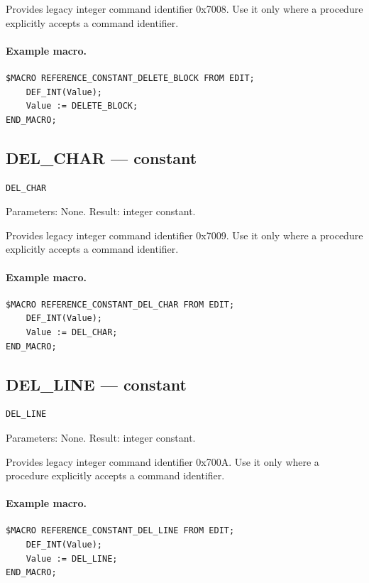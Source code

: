 \documentclass[a4paper,10pt,twoside,openany]{book}
\begin{document}
Provides legacy integer command identifier 0x7008. Use it only where a procedure explicitly accepts a command identifier.

\paragraph{Example macro.}
\begin{verbatim}
$MACRO REFERENCE_CONSTANT_DELETE_BLOCK FROM EDIT;
    DEF_INT(Value);
    Value := DELETE_BLOCK;
END_MACRO;
\end{verbatim}

\label{prim:constant-del-char}
\subsection*{DEL\_CHAR --- constant}
\begin{verbatim}
DEL_CHAR
\end{verbatim}
Parameters: None. Result: integer constant.

Provides legacy integer command identifier 0x7009. Use it only where a procedure explicitly accepts a command identifier.

\paragraph{Example macro.}
\begin{verbatim}
$MACRO REFERENCE_CONSTANT_DEL_CHAR FROM EDIT;
    DEF_INT(Value);
    Value := DEL_CHAR;
END_MACRO;
\end{verbatim}

\label{prim:constant-del-line}
\subsection*{DEL\_LINE --- constant}
\begin{verbatim}
DEL_LINE
\end{verbatim}
Parameters: None. Result: integer constant.

Provides legacy integer command identifier 0x700A. Use it only where a procedure explicitly accepts a command identifier.

\paragraph{Example macro.}
\begin{verbatim}
$MACRO REFERENCE_CONSTANT_DEL_LINE FROM EDIT;
    DEF_INT(Value);
    Value := DEL_LINE;
END_MACRO;
\end{verbatim}
\end{document}
